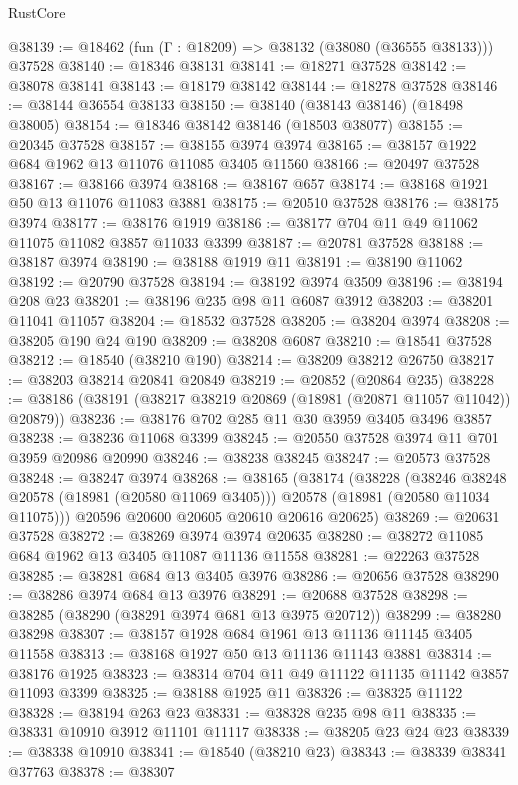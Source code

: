 \begin{lexlean}{RustCore}
\begin{coremodule}
@38139 := @18462 (fun (Γ : @18209) => @38132 (@38080 (@36555 @38133))) @37528
@38140 := @18346 @38131
@38141 := @18271 @37528
@38142 := @38078 @38141
@38143 := @18179 @38142
@38144 := @18278 @37528
@38146 := @38144 @36554 @38133
@38150 := @38140 (@38143 @38146) (@18498 @38005)
@38154 := @18346 @38142 @38146 (@18503 @38077)
@38155 := @20345 @37528
@38157 := @38155 @3974 @3974
@38165 := @38157 @1922 @684 @1962 @13 @11076 @11085 @3405 @11560
@38166 := @20497 @37528
@38167 := @38166 @3974
@38168 := @38167 @657
@38174 := @38168 @1921 @50 @13 @11076 @11083 @3881
@38175 := @20510 @37528
@38176 := @38175 @3974
@38177 := @38176 @1919
@38186 := @38177 @704 @11 @49 @11062 @11075 @11082 @3857 @11033 @3399
@38187 := @20781 @37528
@38188 := @38187 @3974
@38190 := @38188 @1919 @11
@38191 := @38190 @11062
@38192 := @20790 @37528
@38194 := @38192 @3974 @3509
@38196 := @38194 @208 @23
@38201 := @38196 @235 @98 @11 @6087 @3912
@38203 := @38201 @11041 @11057
@38204 := @18532 @37528
@38205 := @38204 @3974
@38208 := @38205 @190 @24 @190
@38209 := @38208 @6087
@38210 := @18541 @37528
@38212 := @18540 (@38210 @190)
@38214 := @38209 @38212 @26750
@38217 := @38203 @38214 @20841 @20849
@38219 := @20852 (@20864 @235)
@38228 := @38186 (@38191 (@38217 @38219 @20869 (@18981 (@20871 @11057 @11042)) @20879))
@38236 := @38176 @702 @285 @11 @30 @3959 @3405 @3496 @3857
@38238 := @38236 @11068 @3399
@38245 := @20550 @37528 @3974 @11 @701 @3959 @20986 @20990
@38246 := @38238 @38245
@38247 := @20573 @37528
@38248 := @38247 @3974
@38268 := @38165
    (@38174
      (@38228
        (@38246 @38248 @20578 (@18981 (@20580 @11069 @3405)))
        @20578
        (@18981 (@20580 @11034 @11075)))
      @20596
      @20600
      @20605
      @20610
      @20616
      @20625)
@38269 := @20631 @37528
@38272 := @38269 @3974 @3974 @20635
@38280 := @38272 @11085 @684 @1962 @13 @3405 @11087 @11136 @11558
@38281 := @22263 @37528
@38285 := @38281 @684 @13 @3405 @3976
@38286 := @20656 @37528
@38290 := @38286 @3974 @684 @13 @3976
@38291 := @20688 @37528
@38298 := @38285 (@38290 (@38291 @3974 @681 @13 @3975 @20712))
@38299 := @38280 @38298
@38307 := @38157 @1928 @684 @1961 @13 @11136 @11145 @3405 @11558
@38313 := @38168 @1927 @50 @13 @11136 @11143 @3881
@38314 := @38176 @1925
@38323 := @38314 @704 @11 @49 @11122 @11135 @11142 @3857 @11093 @3399
@38325 := @38188 @1925 @11
@38326 := @38325 @11122
@38328 := @38194 @263 @23
@38331 := @38328 @235 @98 @11
@38335 := @38331 @10910 @3912 @11101 @11117
@38338 := @38205 @23 @24 @23
@38339 := @38338 @10910
@38341 := @18540 (@38210 @23)
@38343 := @38339 @38341 @37763
@38378 := @38307

\end{coremodule}
\end{lexlean}

